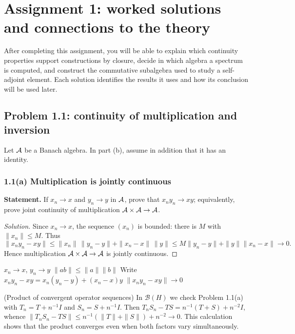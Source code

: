 \chapter{Assignment 1: worked solutions and connections to the theory}

\begin{context}
After completing this assignment, you will be able to explain which continuity properties support
constructions by closure, decide in which algebra a spectrum is computed, and construct the commutative
subalgebra used to study a self-adjoint element. Each solution identifies the results it uses and how its
conclusion will be used later.
\end{context}

\section{Problem 1.1: continuity of multiplication and inversion}

Let $\mathcal A$ be a Banach algebra. In part (b), assume in addition that it has an identity.

\subsection*{1.1(a) Multiplication is jointly continuous}

\noindent\textbf{Statement.} If $x_n\to x$ and $y_n\to y$ in $\mathcal A$, prove that $x_ny_n\to xy$; equivalently, prove joint continuity of multiplication $\mathcal A\times\mathcal A\to\mathcal A$.

\begin{proof}[Solution]
Since $x_n\to x$, the sequence $(x_n)$ is bounded: there is $M$ with $\|x_n\|\le M$. Thus
\[
\|x_ny_n-xy\|
\le \|x_n\|\,\|y_n-y\|+\|x_n-x\|\,\|y\|
\le M\|y_n-y\|+\|y\|\|x_n-x\|\to0.
\]
Hence multiplication $\mathcal A\times\mathcal A\to\mathcal A$ is jointly continuous.
\end{proof}

\proofdiagram
{$x_n\to x$, $y_n\to y$}
{$\|ab\|\le\|a\|\|b\|$}
{Write $x_ny_n-xy=x_n(y_n-y)+(x_n-x)y$}
{$\|x_ny_n-xy\|\to0$}

\begin{cthejemplo}{(Product of convergent operator sequences)}
In $\mathcal B(H)$ we check Problem 1.1(a) with $T_n=T+n^{-1}I$ and $S_n=S+n^{-1}I$.
Then $T_nS_n-TS=n^{-1}(T+S)+n^{-2}I$, whence
$\|T_nS_n-TS\|\le n^{-1}(\|T\|+\|S\|)+n^{-2}\to0$.
This calculation shows that the product converges even when both factors vary simultaneously.
\end{cthejemplo}

